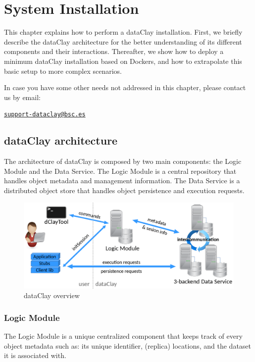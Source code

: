 
\chapter{System Installation}
\label{sec:SystemInstall}

This chapter explains how to perform a dataClay installation. First, we briefly describe the dataClay architecture for the better understanding of its different components and their interactions. Thereafter, we show how to deploy a minimum dataClay installation based on Dockers, and how to extrapolate this basic setup to more complex scenarios.

In case you have some other needs not addressed in this chapter, please contact us by email:

\texttt{\href{mailto:support-dataclay@bsc.es}{support-dataclay@bsc.es}}



\section{dataClay architecture}
The architecture of dataClay is composed by two main components: the Logic Module and the Data Service. The Logic Module is a central repository that handles object metadata and management information. The Data Service is a distributed object store that handles object persistence and execution requests.

\begin{figure}[h]
\centering\includegraphics[scale=0.4]{Installation/dataClayOverview}
\caption{dataClay overview}
\label{fig:dataClayOverview}
\end{figure}

\subsection{Logic Module}
The Logic Module is a unique centralized component that keeps track of every object metadata such as: its unique identifier, (replica) locations, and the dataset it is associated with. 

